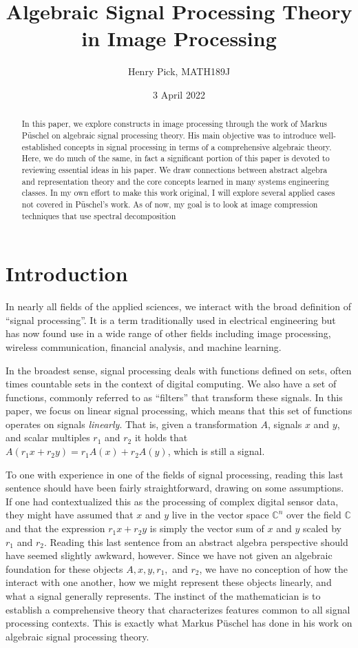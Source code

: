 \documentclass[12pt,technote]{IEEEtran}
\author{Henry Pick, MATH189J}
\title{Algebraic Signal Processing Theory in Image Processing}
\date{3 April 2022}
\begin{document}
\maketitle
\begin{abstract}
    In this paper, we explore constructs in image processing through the work of Markus P\"uschel on algebraic signal processing theory. His main objective was to introduce well-established concepts in signal processing in terms of a comprehensive algebraic theory. Here, we do much of the same, in fact a significant portion of this paper is devoted to reviewing essential ideas in his paper. We draw connections between abstract algebra and representation theory and the core concepts learned in many systems engineering classes. In my own effort to make this work original, I will explore several applied cases not covered in P\"uschel's work. As of now, my goal is to look at image compression techniques that use spectral decomposition
\end{abstract}
\section{Introduction}
In nearly all fields of the applied sciences, we interact with the broad definition of ``signal processing''. It is a term traditionally used in electrical engineering but has now found use in a wide range of other fields including image processing, wireless communication, financial analysis, and machine learning. 

In the broadest sense, signal processing deals with functions defined on sets, often times countable sets in the context of digital computing. We also have a set of functions, commonly referred to as ``filters'' that transform these signals. In this paper, we focus on linear signal processing, which means that this set of functions operates on signals \textit{linearly}. That is, given a transformation $A$, signals $x$ and $y$, and scalar multiples $r_1$ and $r_2$ it holds that $A(r_1x + r_2y) = r_1A(x) + r_2A(y)$, which is still a signal.

To one with experience in one of the fields of signal processing, reading this last sentence should have been fairly straightforward, drawing on some assumptions. If one had contextualized this as the processing of complex digital sensor data, they might have assumed that $x$ and $y$ live in the vector space $\mathbb{C}^n$ over the field $\mathbb{C}$ and that the expression $r_1x + r_2y$ is simply the vector sum of $x$ and $y$ scaled by $r_1$ and $r_2$. Reading this last sentence from an abstract algebra perspective should have seemed slightly awkward, however. Since we have not given an algebraic foundation for these objects $A, x, y, r_1,$ and $r_2$, we have no conception of how the interact with one another, how we might represent these objects linearly, and what a signal generally represents. The instinct of the mathematician is to establish a comprehensive theory that characterizes features common to all signal processing contexts. This is exactly what Markus P\"uschel has done in his work on algebraic signal processing theory\cite{AlgebraicSignalProcessing2006}.
\end{document}
